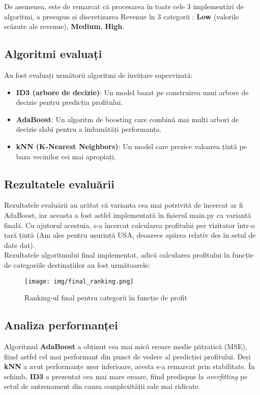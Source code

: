 \documentclass{article}
\begin{document}
De asemenea, este de remarcat că procesarea în toate cele 3 implementări de algoritmi, a presupus și discretizarea Revenue în 3 categorii : \textbf{Low} (valorile scăzute ale revenue), \textbf{Medium}, \textbf{High}.

\subsection*{Algoritmi evaluați}
Au fost evaluați următorii algoritmi de învățare supervizată:
\begin{itemize}
    \item \textbf{ID3 (arbore de decizie)}: Un model bazat pe construirea unui arbore de decizie pentru predicția profitului.
    \item \textbf{AdaBoost}: Un algoritm de boosting care combină mai mulți arbori de decizie slabi pentru a îmbunătăți performanța.
    \item \textbf{kNN (K-Nearest Neighbors)}: Un model care prezice valoarea țintă pe baza vecinilor cei mai apropiați.
\end{itemize}

\subsection*{Rezultatele evaluării}
Rezultatele evaluării au arătat că varianta cea mai potrivită de încercat ar fi AdaBoost, iar aceasta a fost astfel implementată în fișierul main.py ca variantă finală. Cu ajutorul acestuia, s-a încercat calcularea profitului per vizitator într-o țară țintă (Am ales pentru ușurință USA, deoarece apărea relativ des în setul de date dat). \\

Rezultatele algoritmului final implementat, adică calcularea profitului în funcție de categoriile destinațiilor au fost următoarele:

\begin{figure}[H]
\centering
\texttt{[image: img/final\_ranking.png]}
\caption{Ranking-ul final pentru categorii în funcție de profit}
\label{fig:ranking}
\end{figure}

\subsection*{Analiza performanței}
Algoritmul \textbf{AdaBoost} a obținut cea mai mică eroare medie pătratică (MSE), fiind astfel cel mai performant din punct de vedere al predicției profitului. Deși \textbf{kNN} a avut performanțe ușor inferioare, acesta s-a remarcat prin stabilitate. În schimb, \textbf{ID3} a prezentat cea mai mare eroare, fiind predispus la \textit{overfitting} pe setul de antrenament din cauza complexității sale mai ridicate. \\
\end{document}
